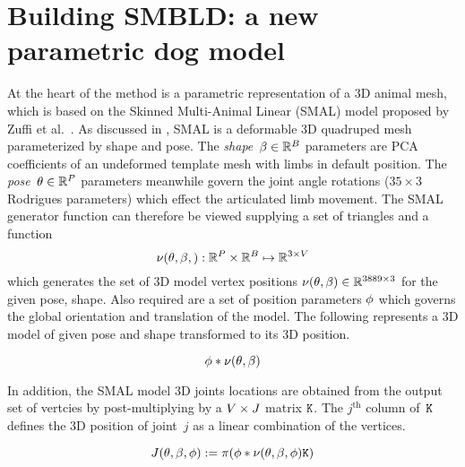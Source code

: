 
\section{Building SMBLD: a new parametric dog model}


At the heart of the method is a parametric representation of a 3D animal mesh, which is based on the Skinned Multi-Animal Linear (SMAL) model proposed by Zuffi et al.~\cite{zuffi2017menagerie}. As discussed in , SMAL is a deformable 3D quadruped mesh parameterized by shape and pose. The \emph{shape}~$\beta \in {\mathbb{R}^{B}}$ parameters are PCA coefficients of an undeformed template mesh with limbs in default position. The \emph{pose}~$\theta \in {\mathbb{R}^{P}}$ parameters meanwhile govern the joint angle rotations ($35 \times 3$ Rodrigues parameters) which effect the articulated limb movement. The SMAL generator function can therefore be viewed supplying a set of triangles and a function 
\begin{equation}
\nu(\theta, \beta,) : {\mathbb{R}^{P}} \times {\mathbb{R}^{B}} \mapsto {\mathbb{R}^{3 \times V}}
\end{equation}
which generates the set of 3D model vertex positions $\nu(\theta, \beta) \in {\mathbb{R}^{3889 \times 3}}$ for the given pose, shape. Also required are a set of position parameters $\phi$ which governs the global orientation and translation of the model. The following represents a 3D model of given pose and shape transformed to its 3D position.

\begin{equation}
    \phi * \nu(\theta, \beta)
\end{equation}    

In addition, the SMAL model 3D joints locations are obtained from the output set of vertcies by post-multiplying by a $V \times J$ matrix $\mathtt{K}$.  The $j^{\text{th}}$ column of~$\mathtt{K}$ defines the 3D position of joint~$j$ as a linear combination of the vertices.

\begin{equation}
J(\theta, \beta, \phi) := \pi(\phi * \nu(\theta, \beta, \phi) \mathtt{K})
\end{equation}


